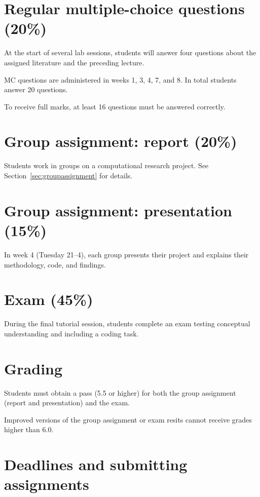 \documentclass[a4paper,10pt]{report}
\begin{document}
\section{Regular multiple-choice questions (20\%)}

At the start of several lab sessions, students will answer four questions about the assigned literature and the preceding lecture.

MC questions are administered in weeks 1, 3, 4, 7, and 8. In total students answer 20 questions.

To receive full marks, at least 16 questions must be answered correctly.

\section{Group assignment: report (20\%)}

Students work in groups on a computational research project. See Section~\ref{sec:groupassignment} for details.

\section{Group assignment: presentation (15\%)}

In week 4 (Tuesday 21--4), each group presents their project and explains their methodology, code, and findings.

\section{Exam (45\%)}

During the final tutorial session, students complete an exam testing conceptual understanding and including a coding task.

\section{Grading}

Students must obtain a pass (5.5 or higher) for both the group assignment (report and presentation) and the exam.

Improved versions of the group assignment or exam resits cannot receive grades higher than 6.0.

\section{Deadlines and submitting assignments}
\end{document}
